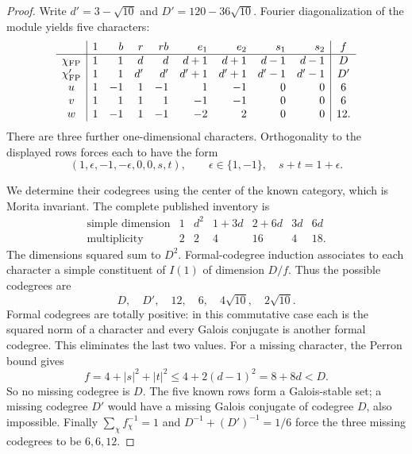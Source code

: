 \begin{proof}
Write $d'=3-\sqrt{10}$ and $D'=120-36\sqrt{10}$. Fourier
diagonalization of the module yields five characters:
\[
\begin{array}{c|rrrrrrrr|c}
&1&b&r&rb&e_1&e_2&s_1&s_2&f\\\hline
\chi_{\rm FP}&1&1&d&d&d+1&d+1&d-1&d-1&D\\
\chi'_{\rm FP}&1&1&d'&d'&d'+1&d'+1&d'-1&d'-1&D'\\
u&1&-1&1&-1&1&-1&0&0&6\\
v&1&1&1&1&-1&-1&0&0&6\\
w&1&-1&1&-1&-2&2&0&0&12.
\end{array}
\]
There are three further one-dimensional characters. Orthogonality
to the displayed rows forces each to have the form
\begin{equation}\label{eq:hi6-missing}
(1,\epsilon,-1,-\epsilon,0,0,s,t),\qquad
\epsilon\in\{1,-1\},\quad s+t=1+\epsilon.
\end{equation}

We determine their codegrees using the center of the known category,
which is Morita invariant. The complete published inventory
\cite[Lemma~3.5 and Theorem~3.9]{GICenters} is
\[
\begin{array}{c|rrrrrr}
\text{simple dimension}&1&d^2&1+3d&2+6d&3d&6d\\\hline
\text{multiplicity}&2&2&4&16&4&18.
\end{array}
\]
The dimensions squared sum to $D^2$. Formal-codegree induction
\cite{OstrikCode} associates to each character a simple constituent
of $I(1)$ of dimension $D/f$. Thus the possible codegrees are
\[
D,\quad D',\quad12,\quad6,\quad4\sqrt{10},\quad2\sqrt{10}.
\]
Formal codegrees are totally positive: in this commutative case each
is the squared norm of a character and every Galois conjugate is
another formal codegree. This eliminates the last two values.
For a missing character, the Perron bound gives
\[
f=4+|s|^2+|t|^2
 \leq4+2(d-1)^2=8+8d<D.
\]
So no missing codegree is $D$. The five known rows form a
Galois-stable set; a missing codegree $D'$ would have a missing
Galois conjugate of codegree $D$, also impossible. Finally
$\sum_\chi f_\chi^{-1}=1$ and $D^{-1}+(D')^{-1}=1/6$ force the
three missing codegrees to be $6,6,12$.


\end{proof}
